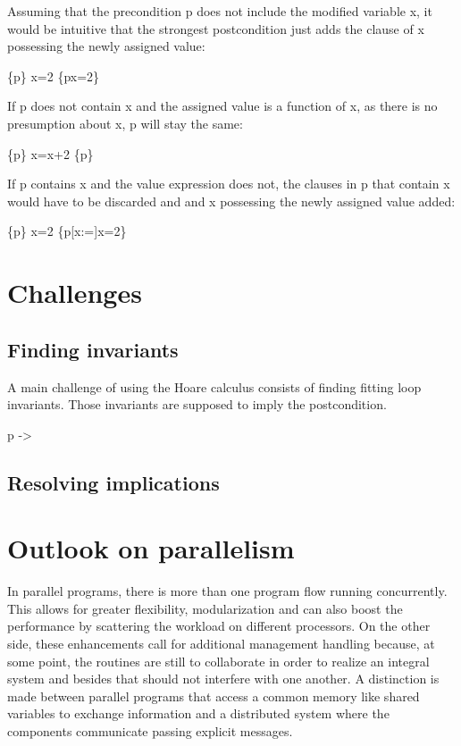 Assuming that the precondition p does not include the modified variable x, it would be intuitive that the strongest postcondition just adds the clause of x possessing the newly assigned value:
\begin{hoare}
\{p\} x=2 \{p\wedge x=2\}
\end{hoare}

If p does not contain x and the assigned value is a function of x, as there is no presumption about x, p will stay the same:
\begin{hoare}
\{p\} x=x+2 \{p\}
\end{hoare}

If p contains x and the value expression does not, the clauses in p that contain x would have to be discarded and and x possessing the newly assigned value added:
\begin{hoare}
\{p\} x=2 \{p[x:=]\wedge x=2\}
\end{hoare}

\section{Challenges}
\subsection{Finding invariants}

A main challenge of using the Hoare calculus consists of finding fitting loop invariants. Those invariants are supposed to imply the postcondition.

p -> 

\subsection{Resolving implications}

\section{Outlook on parallelism}
In parallel programs, there is more than one program flow running concurrently. This allows for greater flexibility, modularization and can also boost the performance by scattering the workload on different processors. On the other side, these enhancements call for additional management handling because, at some point, the routines are still to collaborate in order to realize an integral system and besides that should not interfere with one another. A distinction is made between parallel programs that access a common memory like shared variables to exchange information and a distributed system where the components communicate passing explicit messages.

